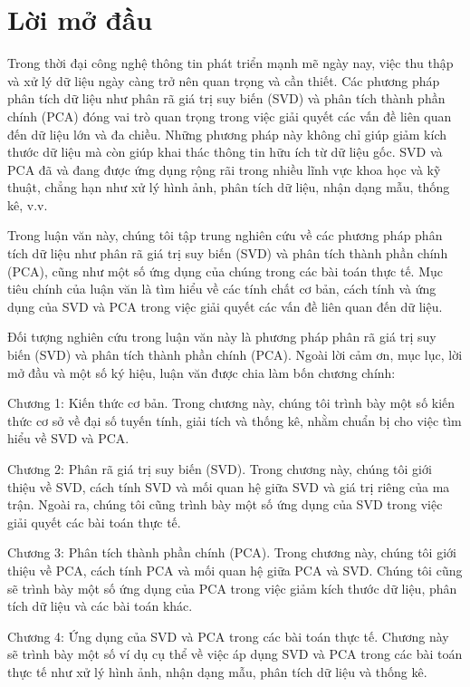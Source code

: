 \documentclass[12pt,a4paper,oneside]{report}
\numberwithin{equation}{section}
\begin{document}
\chapter*{Lời mở đầu}

\begin{justify}   
Trong thời đại công nghệ thông tin phát triển mạnh mẽ ngày nay, việc thu thập và xử lý dữ liệu ngày càng trở nên quan trọng và cần thiết. Các phương pháp phân tích dữ liệu như phân rã giá trị suy biến (SVD) và phân tích thành phần chính (PCA) đóng vai trò quan trọng trong việc giải quyết các vấn đề liên quan đến dữ liệu lớn và đa chiều. Những phương pháp này không chỉ giúp giảm kích thước dữ liệu mà còn giúp khai thác thông tin hữu ích từ dữ liệu gốc. SVD và PCA đã và đang được ứng dụng rộng rãi trong nhiều lĩnh vực khoa học và kỹ thuật, chẳng hạn như xử lý hình ảnh, phân tích dữ liệu, nhận dạng mẫu, thống kê, v.v.

Trong luận văn này, chúng tôi tập trung nghiên cứu về các phương pháp phân tích dữ liệu như phân rã giá trị suy biến (SVD) và phân tích thành phần chính (PCA), cũng như một số ứng dụng của chúng trong các bài toán thực tế. Mục tiêu chính của luận văn là tìm hiểu về các tính chất cơ bản, cách tính và ứng dụng của SVD và PCA trong việc giải quyết các vấn đề liên quan đến dữ liệu.

Đối tượng nghiên cứu trong luận văn này là phương pháp phân rã giá trị suy biến (SVD) và phân tích thành phần chính (PCA). Ngoài lời cảm ơn, mục lục, lời mở đầu và một số ký hiệu, luận văn được chia làm bốn chương chính:

Chương 1: Kiến thức cơ bản. Trong chương này, chúng tôi trình bày một số kiến thức cơ sở về đại số tuyến tính, giải tích và thống kê, nhằm chuẩn bị cho việc tìm hiểu về SVD và PCA.

Chương 2: Phân rã giá trị suy biến (SVD). Trong chương này, chúng tôi giới thiệu về SVD, cách tính SVD và mối quan hệ giữa SVD và giá trị riêng của ma trận. Ngoài ra, chúng tôi cũng trình bày một số ứng dụng của SVD trong việc giải quyết các bài toán thực tế.

Chương 3: Phân tích thành phần chính (PCA). Trong chương này, chúng tôi giới thiệu về PCA, cách tính PCA và mối quan hệ giữa PCA và SVD. Chúng tôi cũng sẽ trình bày một số ứng dụng của PCA trong việc giảm kích thước dữ liệu, phân tích dữ liệu và các bài toán khác.

Chương 4: Ứng dụng của SVD và PCA trong các bài toán thực tế. Chương này sẽ trình bày một số ví dụ cụ thể về việc áp dụng SVD và PCA trong các bài toán thực tế như xử lý hình ảnh, nhận dạng mẫu, phân tích dữ liệu và thống kê.


\end{justify}
\end{document}
